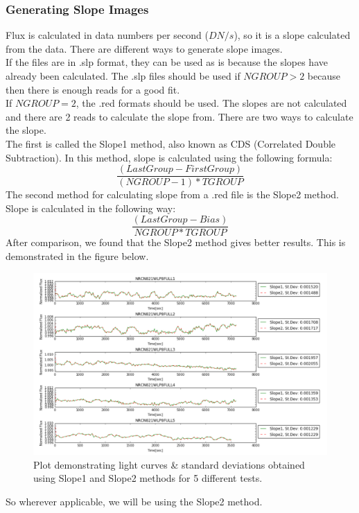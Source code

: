 \documentclass{aastex6}
\begin{document}
        \subsubsection{Generating Slope Images}
        Flux is calculated in data numbers per second ($DN/s$), so it is a slope calculated from the data. There are different ways to generate slope images.\\
        If the files are in .slp format, they can be used as is because the slopes have already been calculated. The .slp files should be used if $NGROUP > 2$ because then there is enough reads for a good fit.\\
        If $NGROUP = 2$, the .red formats should be used. The slopes are not calculated and there are 2 reads to calculate the slope from. There are two ways to calculate the slope.\\
        The first is called the Slope1 method, also known as CDS (Correlated Double Subtraction). In this method, slope is calculated using the following formula:
        $$\frac{(Last Group - First Group)}{(NGROUP-1)*TGROUP}$$
        The second method for calculating slope from a .red file is the Slope2 method. Slope is calculated in the following way:
        $$\frac{(Last Group - Bias)}{NGROUP*TGROUP}$$
        After comparison, we found that the Slope2 method gives better results. This is demonstrated in the figure below.
        \begin{figure}[H]
            \includegraphics[width=1.0\textwidth]{Slopes}
            \caption{Plot demonstrating light curves \& standard deviations obtained using Slope1 and Slope2 methods for 5 different tests.}
            \label{fig:slopes}
        \end{figure}
        So wherever applicable, we will be using the Slope2 method.   
        
\end{document}
